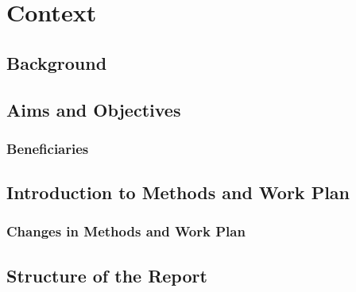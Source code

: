 
\chapter{Context}

\label{Context} 


\section{Background}

\lipsum[1]

\section{Aims and Objectives}

\lipsum[2]

\subsection{Beneficiaries}

\lipsum[3]


\section{Introduction to Methods and Work Plan}

\lipsum[4]


\subsection{Changes in Methods and Work Plan}

\lipsum[4]


\section{Structure of the Report}

\lipsum[6]